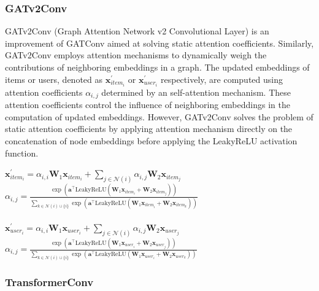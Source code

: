 \documentclass[bst/sn-nature]{sn-jnl}
\begin{document}
\begin{multicols}{2}
\subsubsection{GATv2Conv\cite{gatv2conv}} 

\quad GATv2Conv (Graph Attention Network v2 Convolutional Layer) is an improvement of GATConv aimed at solving static attention coefficients. Similarly, GATv2Conv employs attention mechanisms to dynamically weigh the contributions of neighboring embeddings in a graph. The updated embeddings of items or users, denoted as $\mathbf{x}^{\prime}_{item_i}$ or $\mathbf{x}^{\prime}_{user_i}$ respectively, are computed using attention coefficients $\alpha_{i,j}$ determined by an self-attention mechanism. These attention coefficients control the influence of neighboring embeddings in the computation of updated embeddings. However, GATv2Conv solves the problem of static attention coefficients by applying attention mechanism directly on the concatenation of node embeddings before applying the LeakyReLU activation function. \\

\begin{center}
    $\mathbf{x}^{\prime}_{item_{i}} = \alpha_{i,i}\mathbf{W}_{1}\mathbf{x}_{item_{i}} + \sum_{j \in \mathcal{N}(i)} \alpha_{i,j}\mathbf{W}_{2}\mathbf{x}_{item_{j}}$ \\ 
    $\alpha_{i,j} = \frac{\exp\left(\mathbf{a}^{\top}\mathrm{LeakyReLU}\left(\mathbf{W}_{1} \mathbf{x}_{item_{i}} + \mathbf{W}_{2} \mathbf{x}_{item_{j}}\right)\right)}{\sum_{k \in \mathcal{N}(i) \cup \{ i \}} \exp\left(\mathbf{a}^{\top}\mathrm{LeakyReLU}\left(\mathbf{W}_{1} \mathbf{x}_{item_{i}} + \mathbf{W}_{2} \mathbf{x}_{item_{k}}\right)\right)}$ \\~\\
    $\mathbf{x}^{\prime}_{user_{i}} = \alpha_{i,i}\mathbf{W}_{1}\mathbf{x}_{user_{i}} + \sum_{j \in \mathcal{N}(i)} \alpha_{i,j}\mathbf{W}_{2}\mathbf{x}_{user_{j}}$ \\ 
    $\alpha_{i,j} = \frac{\exp\left(\mathbf{a}^{\top}\mathrm{LeakyReLU}\left(\mathbf{W}_{1} \mathbf{x}_{user_{i}} + \mathbf{W}_{2} \mathbf{x}_{user_{j}}\right)\right)}{\sum_{k \in \mathcal{N}(i) \cup \{ i \}} \exp\left(\mathbf{a}^{\top}\mathrm{LeakyReLU}\left(\mathbf{W}_{1} \mathbf{x}_{user_{i}} + \mathbf{W}_{2} \mathbf{x}_{user_{k}}\right)\right)}$
\end{center}

\subsubsection{TransformerConv\cite{transformerconv}} 


\end{multicols}
\end{document}
